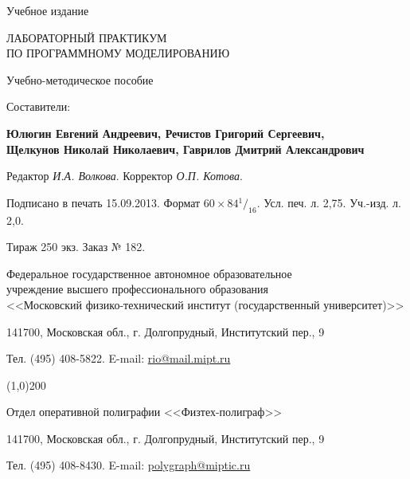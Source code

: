 \thispagestyle{empty}
\begingroup
\small
\parindent=0pt %

\begin{center}

\begin{normalsize}
\textsf{Учебное издание}
\end{normalsize}

\vfill

\begin{large}
\textsf{ЛАБОРАТОРНЫЙ ПРАКТИКУМ \\
        \medskip
        ПО ПРОГРАММНОМУ МОДЕЛИРОВАНИЮ}
\end{large}

\vfill

\begin{normalsize}
Учебно-методическое пособие
\end{normalsize}

\vfill

\begin{small}
Составители:

\textbf{Юлюгин Евгений Андреевич, Речистов Григорий Сергеевич, \\
        Щелкунов Николай Николаевич, Гаврилов Дмитрий Александрович}
\end{small}

\end{center}

\vfill

\begin{flushleft}

\footnotesize

Редактор \textit{И.А. Волкова}. Корректор \textit{О.П. Котова}.

Подписано в печать 15.09.2013. Формат $60 \times 84 {^1}/_{16}$. Усл. печ. л. 2,75. Уч.-изд. л. 2,0.

Тираж 250 экз. Заказ № 182.

\medskip

Федеральное государственное автономное образовательное \\
учреждение высшего профессионального образования \\
<<Московский физико-тех\-ни\-чес\-кий институт (государственный университет)>>

141700, Московская обл., г. Долгопрудный, Институтский пер., 9

Тел. (495) 408-5822. E-mail: \url{rio@mail.mipt.ru}

\line(1,0){200}

Отдел оперативной полиграфии <<Физтех-полиграф>>

141700, Московская обл., г. Долгопрудный, Институтский пер., 9

Тел. (495) 408-8430. E-mail: \url{polygraph@miptic.ru}

\end{flushleft}
\endgroup
{}\label{page:lastpage}